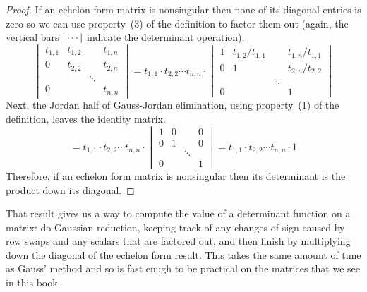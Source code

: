 \begin{proof}
If an echelon form matrix is nonsingular then none of its diagonal entries
is zero so we can use property~(3) of the definition to factor them out
(again, the vertical bars \( \deter{\cdots} \) indicate the determinant
operation).
\begin{equation*}
  \begin{vmatrix}
    t_{1,1}  &t_{1,2}  &     &t_{1,n}  \\
    0        &t_{2,2}  &     &t_{2,n}  \\
             &         &\ddots         \\
    0        &         &     &t_{n,n}
  \end{vmatrix}
  =
  t_{1,1}\cdot t_{2,2}\cdots t_{n,n}\cdot
  \begin{vmatrix}
    1        &t_{1,2}/t_{1,1}  &     &t_{1,n}/t_{1,1}  \\
    0        &1                &     &t_{2,n}/t_{2,2}  \\
             &                 &\ddots         \\
    0        &                 &     &1
  \end{vmatrix}
\end{equation*}
Next, the Jordan half of Gauss-Jordan elimination,
using property~(1) of the definition, leaves the identity matrix.
\begin{equation*}
  =
  t_{1,1}\cdot t_{2,2}\cdots t_{n,n}\cdot
  \begin{vmatrix}
    1        &0                &     &0                \\
    0        &1                &     &0                \\
             &                 &\ddots         \\
    0        &                 &     &1
  \end{vmatrix}
  =
  t_{1,1}\cdot t_{2,2}\cdots t_{n,n}\cdot 1
\end{equation*}
Therefore, if an echelon form matrix is nonsingular then its determinant
is the product down its diagonal. 
\end{proof}

That result gives us a way to compute the value of a determinant
function on a matrix:
do Gaussian reduction, keeping track of any changes of  
sign caused by row swaps and any scalars that are factored out, 
and then finish by multiplying
down the diagonal of the echelon form result.
This takes the same amount of time as Gauss' method and so
is fast enugh to be practical on the matrices that we 
see in this book.

